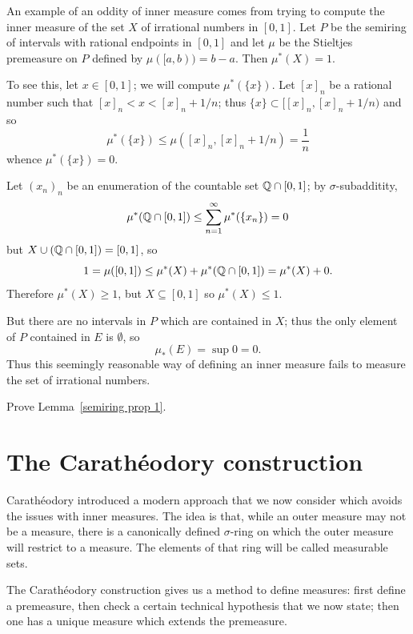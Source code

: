 \begin{example}
An example of an oddity of inner measure comes from trying to compute the inner measure of the set $X$ of irrational numbers in $[0, 1]$.
Let $P$ be the semiring of intervals with rational endpoints in $[0, 1]$ and let $\mu$ be the Stieltjes premeasure on $P$ defined by $\mu([a, b)) = b - a$.
Then $\mu^{*}(X) = 1$.

To see this, let $x \in [0, 1]$; we will compute $\mu^{*}(\{x\})$. Let ${[x]}_{n}$ be a rational number such that ${[x]}_{n} < x < {[x]}_{n} + 1/n$; thus $\{x\} \subset [{[x]}_{n}, {[x]}_{n} + 1/n)$ and so
\[\mu^{*}(\{x\}) \leq \mu({[x]}_{n}, {[x]}_{n} + 1/n) = \frac{1}{n}\]
whence $\mu^{*}(\{x\}) = 0$.

Let ${(x_{n})}_{n}$ be an enumeration of the countable set $\mathbb{Q} \cap [0, 1]$; by $\sigma$-subadditity,
\[\mu^{*}(\mathbb{Q} \cap [0, 1]) \leq \sum_{n=1}^{\infty} \mu^{*}(\{x_{n}\}) = 0\]
but $X \cup (\mathbb{Q} \cap [0, 1]) = [0, 1]$, so
\[1 = \mu([0, 1]) \leq \mu^{*}(X) + \mu^{*}(\mathbb{Q} \cap [0, 1]) = \mu^{*}(X) + 0.\]
Therefore $\mu^{*}(X) \geq 1$, but $X \subseteq [0, 1]$ so $\mu^{*}(X) \leq 1$.

But there are no intervals in $P$ which are contained in $X$; thus the only element of $P$ contained in $E$ is $\emptyset$, so
\[\mu_{*}(E) = \sup 0 = 0.\]
Thus this seemingly reasonable way of defining an inner measure fails to measure the set of irrational numbers.
\end{example}

\begin{exercise}\label{semiring exercise}
Prove Lemma~\ref{semiring prop 1}.
\end{exercise}


\section{The Carathéodory construction}
Carathéodory introduced a modern approach that we now consider which avoids the issues with inner measures.
The idea is that, while an outer measure may not be a measure, there is a canonically defined $\sigma$-ring on which the outer measure will restrict to a measure.
The elements of that ring will be called measurable sets.

\begin{subsec}
The Carathéodory construction gives us a method to define measures: first define a premeasure, then check a certain technical hypothesis that we now state; then one has a unique measure which extends the premeasure.
\end{subsec}

